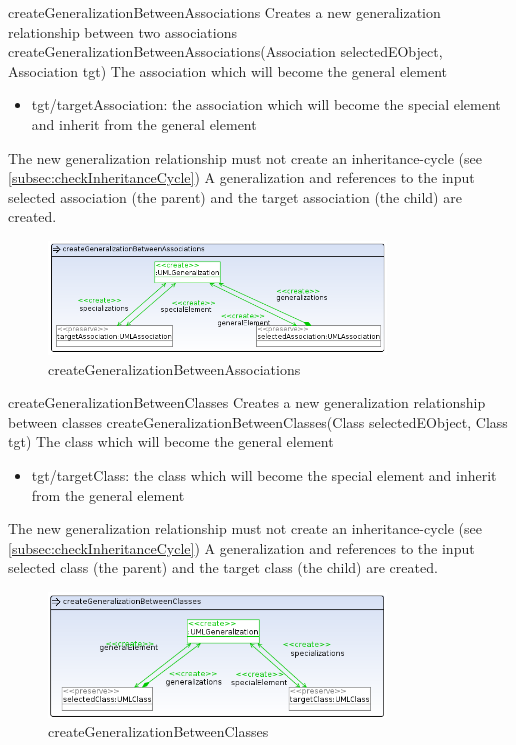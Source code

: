 \op
{createGeneralizationBetweenAssociations}
{Creates a new generalization relationship between two associations}
{createGeneralizationBetweenAssociations(Association selectedEObject,
Association tgt)}
{The association which will become the general element}
{
\begin{itemize}
 \item tgt/targetAssociation: the association which will become the special
 element and inherit from the general element
\end{itemize}
}
{The new generalization relationship must not create an inheritance-cycle (see
\ref{subsec:checkInheritanceCycle})}
{A generalization and references to the input selected association
(the parent) and the target association (the child) are created.} \begin{figure}[H]
  \centering
  \includegraphics[width=0.8\textwidth]{pics/createGeneralizationBetweenAssociations.png}
  \caption{createGeneralizationBetweenAssociations}
  \label{createGeneralizationBetweenAssociations}
\end{figure}
\op
{createGeneralizationBetweenClasses}
{Creates a new generalization relationship between classes}
{createGeneralizationBetweenClasses(Class selectedEObject,
Class tgt)}
{The class which will become the general element}
{
\begin{itemize}
 \item tgt/targetClass: the class which will become the special
 element and inherit from the general element
\end{itemize}
}
{The new generalization relationship must not create an inheritance-cycle (see
\ref{subsec:checkInheritanceCycle})}
{A generalization and references to the input selected class
(the parent) and the target class (the child) are created.}
\begin{figure}[H]
  \centering
  \includegraphics[width=0.8\textwidth]{pics/createGeneralizationBetweenClasses.png}
  \caption{createGeneralizationBetweenClasses}
  \label{createGeneralizationBetweenClasses}
\end{figure}
